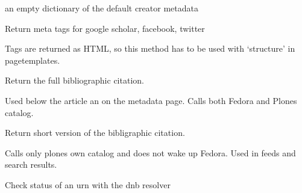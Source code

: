 \documentclass[a4paper,10pt,ngerman]{sphinxmanual}
\begin{document}
\begin{fulllineitems}

\begin{fulllineitems}
\label{tools:Products.DiPP.BibTool.BibTool.get_creator_defaults}
an empty dictionary of the default creator metadata

\end{fulllineitems}


\begin{fulllineitems}
\label{tools:Products.DiPP.BibTool.BibTool.make_metatags}
Return meta tags for google scholar, facebook, twitter

Tags are returned as HTML, so this method has to be used with `structure'
in pagetemplates.

\end{fulllineitems}


\begin{fulllineitems}
\label{tools:Products.DiPP.BibTool.BibTool.recommended_citation}
Return the full bibliographic citation.

Used below the article an on the  metadata page. Calls both
Fedora and Plones catalog.

\end{fulllineitems}


\begin{fulllineitems}
\label{tools:Products.DiPP.BibTool.BibTool.short_citation}
Return short version of the bibligraphic citation.

Calls only plones own catalog and does not wake up Fedora. Used in feeds
and search results.

\end{fulllineitems}


\begin{fulllineitems}
\label{tools:Products.DiPP.BibTool.BibTool.urnstatus}
Check status of an urn with the dnb resolver

\end{fulllineitems}


\end{fulllineitems}
\end{document}
